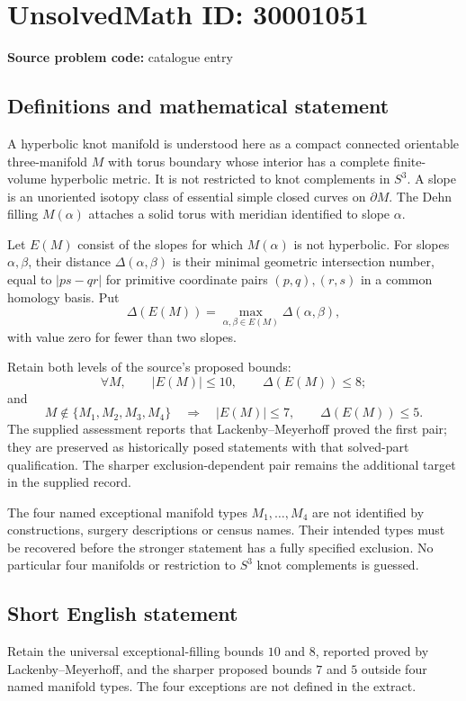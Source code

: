 \documentclass[11pt]{article}
\begin{document}
\section*{UnsolvedMath ID: 30001051}
\textbf{Source problem code:} catalogue entry
\subsection{Definitions and mathematical statement}
A hyperbolic knot manifold is understood here as a compact connected orientable three-manifold $M$ with torus boundary whose interior has a complete finite-volume hyperbolic metric. It is not restricted to knot complements in $S^3$. A slope is an unoriented isotopy class of essential simple closed curves on $\partial M$. The Dehn filling $M(\alpha)$ attaches a solid torus with meridian identified to slope $\alpha$.

Let $E(M)$ consist of the slopes for which $M(\alpha)$ is not hyperbolic. For slopes $\alpha,\beta$, their distance $\Delta(\alpha,\beta)$ is their minimal geometric intersection number, equal to $|ps-qr|$ for primitive coordinate pairs $(p,q),(r,s)$ in a common homology basis. Put
\[
\Delta(E(M))=\max_{\alpha,\beta\in E(M)}\Delta(\alpha,\beta),
\]
with value zero for fewer than two slopes.

Retain both levels of the source's proposed bounds:
\[
\forall M,\qquad |E(M)|\leq10,\qquad\Delta(E(M))\leq8;
\]
and
\[
M\notin\{M_1,M_2,M_3,M_4\}\quad\Longrightarrow\quad
|E(M)|\leq7,\qquad\Delta(E(M))\leq5.
\]
The supplied assessment reports that Lackenby--Meyerhoff proved the first pair; they are preserved as historically posed statements with that solved-part qualification. The sharper exclusion-dependent pair remains the additional target in the supplied record.

The four named exceptional manifold types $M_1,\ldots,M_4$ are not identified by constructions, surgery descriptions or census names. Their intended types must be recovered before the stronger statement has a fully specified exclusion. No particular four manifolds or restriction to $S^3$ knot complements is guessed.
\subsection{Short English statement}
Retain the universal exceptional-filling bounds $10$ and $8$, reported proved by Lackenby--Meyerhoff, and the sharper proposed bounds $7$ and $5$ outside four named manifold types. The four exceptions are not defined in the extract.
\end{document}
